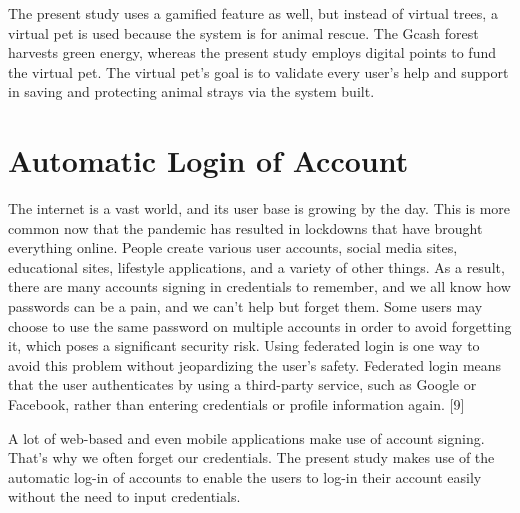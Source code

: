 The present study uses a gamified feature as well, but instead of virtual
trees, a virtual pet is used because the system is for animal rescue. The
Gcash forest harvests green energy, whereas the present study employs digital
points to fund the virtual pet. The virtual pet’s goal is to validate every user’s
help and support in saving and protecting animal strays via the system built.

\section{Automatic Login of Account}

The internet is a vast world, and its user base is growing by the day. This
is more common now that the pandemic has resulted in lockdowns that have
brought everything online. People create various user accounts, social media sites,
educational sites, lifestyle applications, and a variety of other things. As a result,
there are many accounts signing in credentials to remember, and we all know how
passwords can be a pain, and we can’t help but forget them. Some users may
choose to use the same password on multiple accounts in order to avoid forgetting
it, which poses a significant security risk. Using federated login is one way to avoid
this problem without jeopardizing the user’s safety. Federated login means that
the user authenticates by using a third-party service, such as Google or Facebook,
rather than entering credentials or profile information again. [9]

A lot of web-based and even mobile applications make use of account signing.
That’s why we often forget our credentials. The present study makes use of
the automatic log-in of accounts to enable the users to log-in their account easily
without the need to input credentials.






